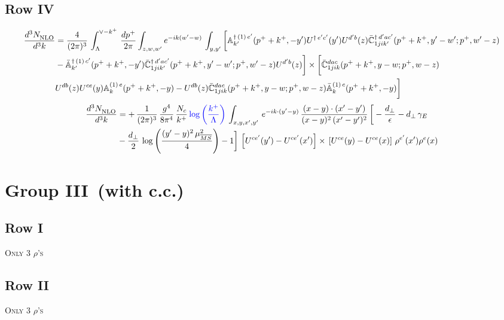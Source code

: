 \documentclass[9pt]{article}
\def\mf#1{\mathbb{#1}}
\numberwithin{equation}{section}
\begin{document}
\subsection{Row IV}
\begin{align}
    \frac{d^{3}N_{\rm NLO}^{\rm}}{d^{3}k}  & = \frac{4}{(2\pi)^{3}}\,\int_{\Lambda}^{\vee-k^{+}}\, \frac{dp^{+}}{2\pi}\int_{z,w,w^{\prime}} e^{-ik(w^{\prime}-w)}\,  \int_{y,y^{\prime}}\bigg[\mf{A}^{\dagger\, (1)\,e^{\prime}}_{k^{\prime}}(p^{+}+k^{+},-y^{\prime})U^{\dagger\, e^{\prime}c^{\prime}}(y^{\prime})U^{d^{\prime}b}(z) \Bar{\mf{C}}^{\dagger\, d^{\prime}ac^{\prime}}_{1jik^{\prime}}(p^{+}+k^{+},y^{\prime}-w^{\prime}; p^{+},w^{\prime}-z) \notag \\ &  -\Bar{\mf{A}}^{\dagger\, (1)\,c^{\prime}}_{k^{\prime}}(p^{+}+k^{+},-y^{\prime}) \Bar{\mf{C}}^{\dagger\, d^{\prime}ac^{\prime}}_{1jik^{\prime}}(p^{+}+k^{+},y^{\prime}-w^{\prime}; p^{+},w^{\prime}-z)U^{d^{\prime}b}(z)\bigg]\times\bigg[\Bar{\mf{C}}^{dac}_{1jik}(p^{+}+k^{+},y-w; p^{+},w-z)\notag \\ & U^{db}(z)U^{ce}(y) \mf{A}^{(1)\,e}_{k}(p^{+}+k^{+},-y) -U^{db}(z) \Bar{\mf{C}}^{dac}_{1jik}(p^{+}+k^{+},y-w; p^{+},w-z)\Bar{\mf{A}}^{(1)\,c}_{k}(p^{+}+k^{+},-y)\bigg]\nonumber
\end{align}
\begin{align}
    \frac{d^{3}N_{\rm NLO}^{\rm}}{d^{3}k}  & =  +\,\frac{1}{(2\pi)^{3}}\,\frac{g^{4}}{8\pi^{4}}\, \frac{N_{c}}{k^{+}}\,{\color{blue}\log{\left(\frac{k^{+}}{\Lambda}\right)}}\,\int_{x,y,x',y'}\,e^{-ik\cdot (y'-y)}\,\frac{(x-y)\cdot (x'-y')}{(x-y)^{2}\,(x'-y')^{2}}\,\bigg[-\frac{d_{\perp}}{\epsilon}-d_{\perp}\,\gamma_{E}\notag \\ & -\frac{d_{\perp}}{2}\,\log{\left(\frac{(y'-y)^{2}\,\mu^{2}_{\overline{MS}}}{4}\right)}-1\bigg]\,\left[U^{ce'}(y') - U^{ce'}(x')\right] \times\, \left[U^{ce}(y) - U^{ce}(x)\right]\, \rho^{e'}(x') \rho^{e}(x)
\end{align}
\section{Group III\, (with c.c.)}
\subsection{Row I}
\textsc{Only 3 $\rho$'s}
\subsection{Row II}
\textsc{Only 3 $\rho$'s}
\end{document}

